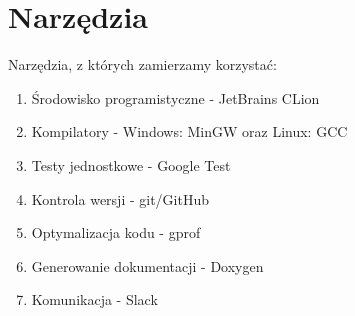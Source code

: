 \chapter{Narzędzia}

Narzędzia, z których zamierzamy korzystać:

\begin{enumerate}
\item Środowisko programistyczne - JetBrains CLion
\item Kompilatory - Windows: MinGW oraz Linux: GCC
\item Testy jednostkowe - Google Test
\item Kontrola wersji - git/GitHub
\item Optymalizacja kodu - gprof
\item Generowanie dokumentacji - Doxygen
\item Komunikacja - Slack
\end{enumerate}